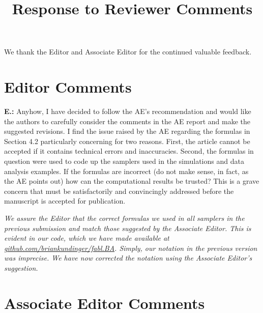 \documentclass[letterpaper, parskip]{scrartcl}
\newcommand{\pointRaised}[2]{%
	\textbf{#1.\theresponsectr:} #2
}
\newcounter{responsectr}[section]     %
\newcommand{\reply}[1]{%
	\refstepcounter{responsectr}%
		\begin{tcolorbox}
			\itshape #1
		\end{tcolorbox}
}
\begin{document}

	\title{Response to Reviewer Comments}
	\maketitle
	
We thank the Editor and Associate Editor for the continued valuable feedback.
	

\section{Editor Comments}



\pointRaised{E}{Anyhow, I have decided to follow the AE’s recommendation and would like the authors to carefully consider the comments in the AE report and make the suggested revisions. I find the issue raised by the AE regarding the formulas in Section 4.2 particularly concerning for two reasons. First, the article cannot be accepted if it contains technical errors and inaccuracies. Second, the formulas in question were used to code up the samplers used in the simulations and data analysis examples. If the formulas are incorrect (do not make sense, in fact, as the AE points out) how can the computational results be trusted? This is a grave concern that must be satisfactorily and convincingly addressed before the manuscript is accepted for publication.}

\reply{We assure the Editor that the correct formulas we used in all samplers in the previous submission and match those suggested by the Associate Editor. This is evident in our code, which we have made available at \url{github.com/briankundinger/fabl.BA}. Simply, our notation in the previous version was imprecise. We have now corrected the notation using the Associate Editor's suggestion.}

\section{Associate Editor Comments}
\end{document}
